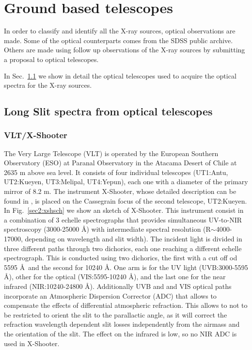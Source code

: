 \section{Ground based telescopes}
\label{sec2:tel}


In order to classify and identify all the X-ray sources, optical observations are made. Some of the optical counterparts comes from the SDSS public archive. Others are made using follow up observations of the X-ray sources by submitting a proposal to optical telescopes.

In Sec.~\ref{sec2:otel} we show in detail the optical telescopes used to acquire the optical spectra for the X-ray sources.


\subsection{Long Slit spectra from optical telescopes}
\label{sec2:otel}


\subsubsection{VLT/X-Shooter}
\label{sec2:xsh}

The Very Large Telescope (VLT) is operated by the European Southern Observatory (ESO) at Paranal Observatory in the Atacama Desert of Chile at 2635 m above sea level. It consists of four individual telescopes (UT1:Antu, UT2:Kueyen, UT3:Melipal, UT4:Yepun), each one with a diameter of the primary mirror of 8.2 m. The instrument X-Shooter, whose detailed description can be found in \cite{vernet11}, is placed on the Cassegrain focus of the second telescope, UT2:Kueyen. In Fig.~\ref{sec2:xshsch} we show an sketch of X-Shooter. This instrument consist in a combination of 3 echelle spectrographs that provides simultaneous UV-to-NIR spectroscopy (3000-25000 \AA) with intermediate spectral resolution (R$\sim$4000-17000, depending on wavelength and slit width). The incident light is divided in three different paths through two dichorics, each one reaching a different echelle spectrograph. This is conducted using two dichorics, the first with a cut off od 5595 \AA~and the second for 10240 \AA. One arm is for the UV light (UVB:3000-5595 \AA), other for the optical (VIS:5595-10240 \AA), and the last one for the near infrared (NIR:10240-24800 \AA). Additionally UVB and and VIS optical paths incorporate an Atmospheric Dispersion Corrector (ADC) that allows to compensate the effects of differential atmospheric refraction. This allows to not to be restricted to orient the slit to the parallactic angle, as it will correct the refraction wavelength dependent slit losses independently from the airmass and the orientation of the slit. The effect on the infrared is low, so no NIR ADC is used in X-Shooter.

